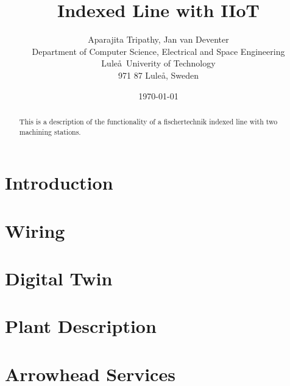 \documentclass[12pt]{article}
\title{Indexed Line with IIoT}
\author{Aparajita Tripathy, Jan van Deventer \\Department of Computer Science, Electrical and Space Engineering\\Lule\aa\ Univerity of Technology \\ 971 87 Lule\aa, Sweden}
\date{\today}
\begin{document}
\maketitle

\begin{abstract}
This is a description of the functionality of a fischertechnik indexed line with two machining stations.
\end{abstract}

\section{Introduction}


\section{Wiring}


\section{Digital Twin}

\section{Plant Description}

\section{Arrowhead Services}


%
%
\end{document}
